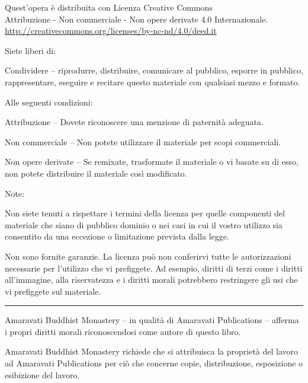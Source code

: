 \cleartoverso
\thispagestyle{bottomcenter}

\vspace*{-2\baselineskip}
\enlargethispage{\baselineskip}

{\fontsize{8}{9}\selectfont\setlength{\parindent}{0pt}%
\raggedright\label{copyright-details}
\setlength{\parskip}{3pt}

{\centering

{\normalsize\ccbyncnd}

Quest'opera è distribuita con Licenza Creative Commons\\
Attribuzione - Non commerciale - Non opere derivate 4.0 Internazionale.\\
\href{http://creativecommons.org/licenses/by-nc-nd/4.0/deed.it}{http://creativecommons.org/licenses/by-nc-nd/4.0/deed.it}

}

Siete liberi di:

\begin{packeditemize}
\item Condividere -- riprodurre, distribuire, comunicare al pubblico, esporre in pubblico, rappresentare, eseguire e recitare questo materiale con qualsiasi mezzo e formato.
\end{packeditemize}

Alle seguenti condizioni:

\begin{packeditemize}
\item Attribuzione -- Dovete riconoscere una menzione di paternità adeguata.
\item Non commerciale -- Non potete utilizzare il materiale per scopi commerciali.
\item Non opere derivate -- Se remixate, trasformate il materiale o vi basate su di esso, non potete distribuire il materiale così modificato. 
\end{packeditemize}

Note:

Non siete tenuti a rispettare i termini della licenza per quelle
componenti del materiale che siano di pubblico dominio o nei casi in cui
il vostro utilizzo sia consentito da una eccezione o limitazione
prevista dalla legge.

Non sono fornite garanzie. La licenza può non conferirvi tutte le
autorizzazioni necessarie per l'utilizzo che vi prefiggete. Ad esempio,
diritti di terzi come i diritti all'immagine, alla riservatezza e i
diritti morali potrebbero restringere gli usi che vi prefiggete sul
materiale.

{\centering
  \color[gray]{0.4}\rule{0.4\linewidth}{0.1pt}%
\par}

Amaravati Buddhist Monastery -- in qualità di Amaravati Publications -- afferma
i propri diritti morali riconoscendosi come autore di questo libro.

Amaravati Buddhist Monastery richiede che si attribuisca la proprietà del lavoro
ad Amaravati Publications per ciò che concerne copie, distribuzione, esposizione
o esibizione del lavoro.

}
